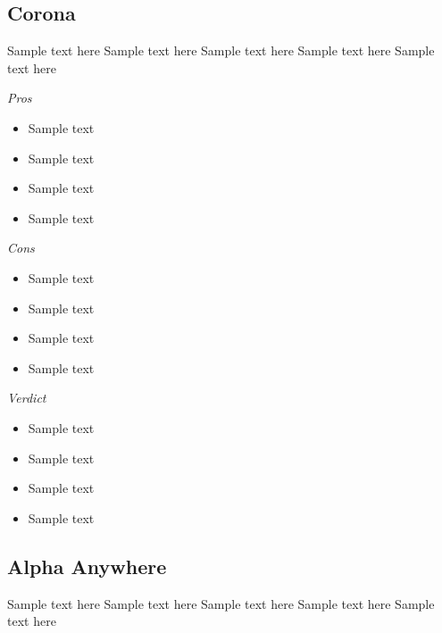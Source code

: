 \documentclass[11pt]{article}
\begin{document}
\subsection{Corona}

Sample text here
Sample text here
Sample text here
Sample text here
Sample text here \par

\emph{Pros}
\begin{itemize}
  \setlength{\itemsep}{0mm}  
  \item Sample text
  \item Sample text
  \item Sample text
  \item Sample text
\end{itemize}
\par
\emph{Cons}
\begin{itemize}
  \setlength{\itemsep}{0mm}  
  \item Sample text
  \item Sample text
  \item Sample text
  \item Sample text
\end{itemize}
\par
\emph{Verdict}
\begin{itemize}
  \setlength{\itemsep}{0mm}  
  \item Sample text
  \item Sample text
  \item Sample text
  \item Sample text
\end{itemize}


\subsection{Alpha Anywhere}

Sample text here
Sample text here
Sample text here
Sample text here
Sample text here \par
\end{document}
